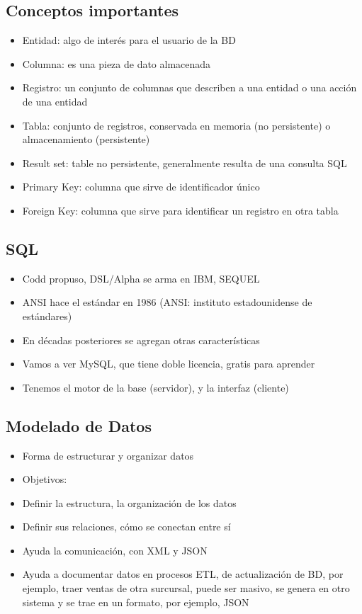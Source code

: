 \subsection{Conceptos importantes}
\begin{itemize}
    \item Entidad: algo de interés para el usuario de la BD
    \item Columna: es una pieza de dato almacenada 
    \item Registro: un conjunto de columnas que describen a una entidad o una 
    acción de una entidad 
    \item Tabla: conjunto de registros, conservada en memoria (no persistente)
    o almacenamiento (persistente)
    \item Result set: table no persistente, generalmente resulta de una consulta 
    SQL 
    \item Primary Key: columna que sirve de identificador único 
    \item Foreign Key: columna que sirve para identificar un registro en otra tabla
\end{itemize}

\subsection{SQL}
\begin{itemize}
    \item Codd propuso, DSL/Alpha se arma en IBM, SEQUEL
    \item ANSI hace el estándar en 1986 (ANSI: instituto estadounidense de estándares)
    \item En décadas posteriores se agregan otras características
    \item Vamos a ver MySQL, que tiene doble licencia, gratis para aprender
    \item Tenemos el motor de la base (servidor), y la interfaz (cliente)
\end{itemize}

\subsection{Modelado de Datos}
\begin{itemize}
    \item Forma de estructurar y organizar datos 
    \item Objetivos:
    \item Definir la estructura, la organización de los datos 
    \item Definir sus relaciones, cómo se conectan entre sí 
    \item Ayuda la comunicación, con XML y JSON
    \item Ayuda a documentar datos en procesos ETL, de actualización de BD,
    por ejemplo, traer ventas de otra surcursal, puede ser masivo,
    se genera en otro sistema y se trae en un formato, por ejemplo, JSON 
\end{itemize}

